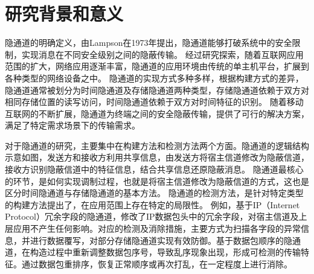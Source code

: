 \section{研究背景和意义}
\label{sec:intro:backgroud}



隐通道的明确定义，由Lampson在1973年提出，隐通道能够打破系统中的安全限制，实现消息在不同安全级别之间的隐蔽传输。
经过研究探索，随着互联网应用范围的扩大，网络应用逐渐丰富，隐通道的应用环境由传统的单主机平台，扩展到各种类型的网络设备之中。
隐通道的实现方式多种多样，根据构建方式的差异，隐通道通常被划分为时间隐通道及存储隐通道两种类型，存储隐通道依赖于双方对相同存储位置的读写访问，时间隐通道依赖于双方对时间特征的识别。
随着移动互联网的不断扩展，隐通道为终端之间的安全隐蔽传输，提供了可行的解决方案，满足了特定需求场景下的传输需求。


对于隐通道的研究，主要集中在构建方法和检测方法两个方面。隐通道的逻辑结构示意如图，发送方和接收方利用共享信息，由发送方将宿主信道修改为隐蔽信道，接收方识别隐蔽信道中的特征信息，结合共享信息还原隐蔽消息。
隐通道最核心的环节，是如何实现调制过程，也就是将宿主信道修改为隐蔽信道的方式，这也是区分时间隐通道与存储隐通道的基本方法。
隐通道的检测方法，是针对特定类型的构建方法提出了，在应用范围上存在特定的局限性。
例如，基于IP（Internet Protocol）冗余字段的隐通道，修改了IP数据包头中的冗余字段，对宿主信道及上层应用不产生任何影响。对应的检测及消除措施，主要方式为扫描各字段的异常信息，并进行数据覆写，对部分存储隐通道实现有效防御。基于数据包顺序的隐通道，在构造过程中重新调整数据包序号，导致乱序现象出现，形成可检测的传输特征。通过数据包重排序，恢复正常顺序或再次打乱，在一定程度上进行消除。

